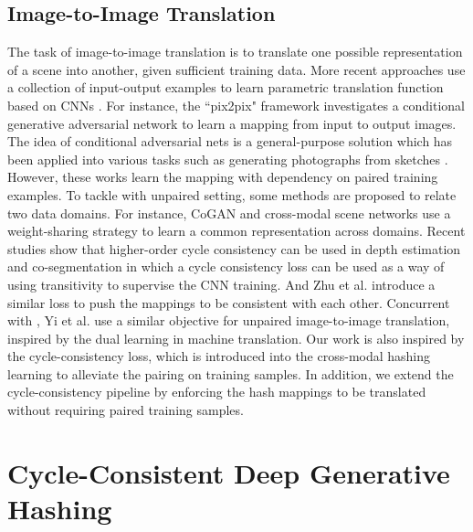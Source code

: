 \documentclass[10pt,journal,twocolumn]{IEEEtran}
\begin{document}
\subsection{Image-to-Image Translation}

The task of image-to-image translation is to translate one possible representation of a
scene into another, given sufficient training data. More recent approaches use a collection of input-output examples to learn parametric translation function based on CNNs \cite{Fully-CNN}. For instance, the ``pix2pix" framework \cite{Pix2Pix} investigates a conditional generative adversarial network to learn a mapping from input to output images. The idea of conditional adversarial nets is a general-purpose solution which has been applied into various tasks such as generating photographs from sketches \cite{Scribbler}. However, these works learn the mapping with dependency on paired training examples. To tackle with unpaired setting, some methods are proposed to relate two data domains. For instance, CoGAN \cite{Coupled-GAN} and cross-modal scene networks \cite{Cross-scene-network} use a weight-sharing strategy to learn a common representation across domains. Recent studies show that higher-order cycle consistency can be used in depth estimation \cite{Depth-left-right} and co-segmentation \cite{co-segmentation-consistent} in which a cycle consistency loss can be used as a way of using transitivity to supervise the CNN training. And Zhu et al. \cite{CycleGAN} introduce a similar loss to push the mappings to be consistent with each other. Concurrent with \cite{CycleGAN}, Yi et al. \cite{Dual-GAN} use a similar objective for unpaired image-to-image translation, inspired by the dual learning in machine translation. Our work is also inspired by the cycle-consistency loss, which is introduced into the cross-modal hashing learning to alleviate the pairing on training samples. In addition, we extend the cycle-consistency pipeline by enforcing the hash mappings to be translated without requiring paired training samples.
\section{Cycle-Consistent Deep Generative Hashing}\label{sec:approach}
\end{document}

